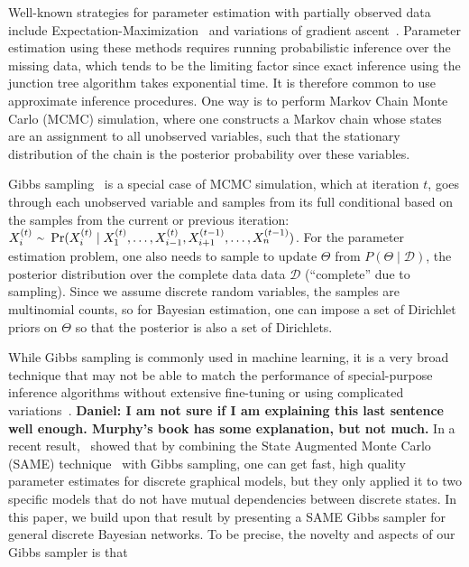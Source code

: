 \documentclass{article} %
\begin{document}
Well-known strategies for parameter estimation with partially observed data include
Expectation-Maximization~\citep{EMpaper} and variations of gradient ascent~\citep{Thiesson95}.
Parameter estimation using these methods requires running probabilistic inference over the missing
data, which tends to be the limiting factor since  exact inference using the junction tree algorithm
takes exponential time. It is therefore common to use approximate inference procedures.  One way is
to perform Markov Chain Monte Carlo (MCMC) simulation, where one constructs a Markov chain whose
states are an assignment to all unobserved variables, such that the stationary distribution of the
chain is the posterior probability over these variables.

Gibbs sampling~\citep{Geman1984} is a special case of MCMC simulation, which at iteration $t$, goes
through each unobserved variable and samples from its full conditional based on the samples from the
current or previous iteration: $X_i^{(t)}\ {\raise.17ex\hbox{$\scriptstyle\sim$}} \
\Pr(X_i^{(t)} \mid X_1^{(t)}, \ldots, X_{i-1}^{(t)}, X_{i+1}^{(t-1)}, \ldots, X_n^{(t-1)})$. For the
parameter estimation problem, one also needs to sample to update $\Theta$ from $P(\Theta
\mid \mathcal{D})$, the posterior distribution over the complete data data $\mathcal{D}$
(``complete'' due to sampling). Since we assume discrete random variables, the samples are
multinomial counts, so for Bayesian estimation, one can impose a set of Dirichlet priors on
$\Theta$ so that the posterior is also a set of Dirichlets.

While Gibbs sampling is commonly used in machine learning, it is a very broad technique that may not
be able to match the performance of special-purpose inference algorithms without extensive
fine-tuning or using complicated variations~\citep{Murphy2012}. \textbf{Daniel: I am not sure if I
am explaining this last sentence well enough. Murphy's book has some explanation, but not much.} In
a recent result,~\citet{SAME2015} showed that by combining the State Augmented Monte Carlo (SAME)
technique~\citep{SAME2002} with Gibbs sampling, one can get fast, high quality parameter estimates
for discrete graphical models, but they only applied it to two specific models that do not have
mutual dependencies between discrete states.  In this paper, we build upon that result by
presenting a SAME Gibbs sampler for general discrete Bayesian networks. To be precise, the
novelty and aspects of our Gibbs sampler is that
\end{document}
